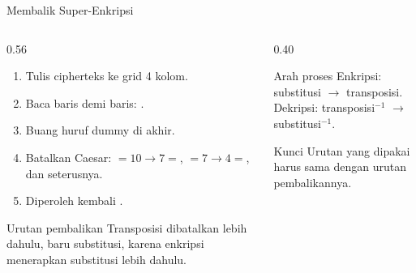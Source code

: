\documentclass[aspectratio=169,11pt]{beamer}
\begin{document}
\begin{frame}{Membalik Super-Enkripsi}
    \begin{columns}[T,onlytextwidth]
        \begin{column}{0.56\textwidth}
            \begin{enumerate}
                \item Tulis cipherteks  ke grid 4 kolom.
                \item Baca baris demi baris: .
                \item Buang huruf dummy  di akhir.
                \item Batalkan Caesar: $=10\rightarrow7=$,
                      $=7\rightarrow4=$, dan seterusnya.
                \item Diperoleh kembali .
            \end{enumerate}
            \begin{alertblock}{Urutan pembalikan}
                \footnotesize
                Transposisi dibatalkan lebih dahulu, baru substitusi, karena
                enkripsi menerapkan substitusi lebih dahulu.
            \end{alertblock}
        \end{column}
        \begin{column}{0.40\textwidth}
            \begin{block}{Arah proses}
                \footnotesize
                Enkripsi: substitusi $\rightarrow$ transposisi.\\
                Dekripsi: transposisi$^{-1}$ $\rightarrow$
                substitusi$^{-1}$.
            \end{block}
            \begin{exampleblock}{Kunci}
                \footnotesize
                Urutan yang dipakai harus sama dengan urutan pembalikannya.
            \end{exampleblock}
        \end{column}
    \end{columns}
\end{frame}

\end{document}
